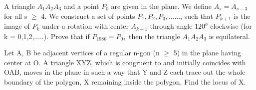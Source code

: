 \item A triangle $A_1 A_2 A_3$ and a point $P_0$ are given in the plane. We define $A_s = A_{s-3}$ for all s $\geq$ 4. We construct a set of points $P_1, P_2, P_3,$......, such that $P_{k+1}$ is the image of $P_k$ under a rotation with center $A_{k+1}$ through angle $120^{o}$ clockwise (for k = 0,1,2,.....). Prove that if $P_{1986}= P_0,$ then the triangle $A_1 A_2 A_3$ is equilateral.

\item Let A, B be adjacent vertices of a regular n-gon (n $\geq$ 5) in the plane having center at O. A triangle XYZ, which is congruent to and initially coincides with OAB, moves in the plane in such a way that Y and Z each trace out the whole boundary of the polygon, X remaining inside the polygon. Find the locus of X.




















